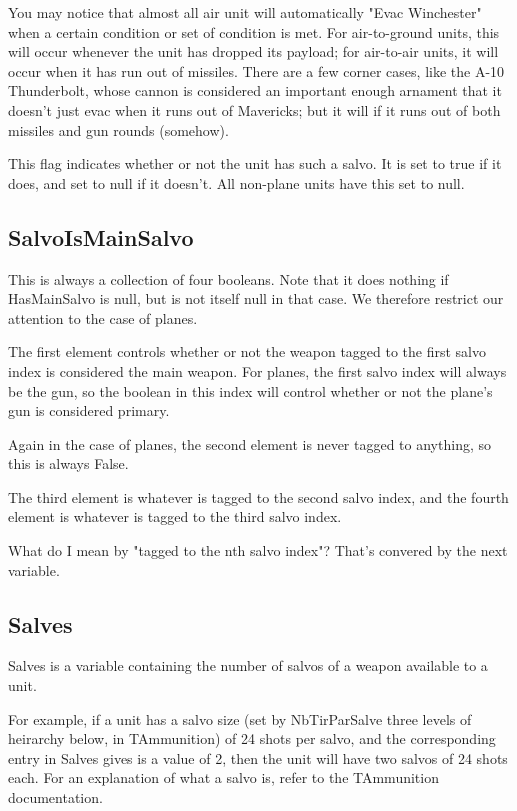 \documentclass{article}
\begin{document}
You may notice that almost all air unit will automatically "Evac Winchester" when a certain condition or set of condition is met. For air-to-ground units, this will occur whenever the unit has dropped its payload; for air-to-air units, it will occur when it has run out of missiles. There are a few corner cases, like the A-10 Thunderbolt, whose cannon is considered an important enough arnament that it doesn't just evac when it runs out of Mavericks; but it will if it runs out of both missiles and gun rounds (somehow).

This flag indicates whether or not the unit has such a salvo. It is set to true if it does, and set to null if it doesn't. All non-plane units have this set to null.

\subsection{SalvoIsMainSalvo}

This is always a collection of four booleans. Note that it does nothing if HasMainSalvo is null, but is not itself null in that case. We therefore restrict our attention to the case of planes.

The first element controls whether or not the weapon tagged to the first salvo index is considered the main weapon. For planes, the first salvo index will always be the gun, so the boolean in this index will control whether or not the plane's gun is considered primary.

Again in the case of planes, the second element is never tagged to anything, so this is always False.

The third element is whatever is tagged to the second salvo index, and the fourth element is whatever is tagged to the third salvo index.

What do I mean by "tagged to the nth salvo index"? That's convered by the next variable.

\subsection{Salves}

Salves is a variable containing the number of salvos of a weapon available to a unit.

For example, if a unit has a salvo size (set by NbTirParSalve three levels of heirarchy below, in TAmmunition) of 24 shots per salvo, and the corresponding entry in Salves gives is a value of 2, then the unit will have two salvos of 24 shots each. For an explanation of what a salvo is, refer to the TAmmunition documentation.
\end{document}
